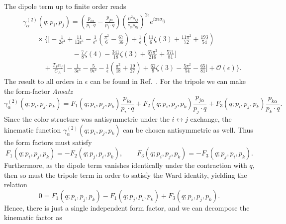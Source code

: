 \documentclass[a4paper,11pt]{article}
\begin{document}
The dipole term up to finite order reads
\begin{equation}
\begin{split}
&\gamma^{(2)}_\alpha (q; p_i, p_j) = \left( \frac{p_{i \alpha}}{p_{i} \cdot q} - \frac{p_{j \alpha}}{p_j \cdot q} \right) \left( \frac{\mu^2 s_{ij}}{s_{qi} s_{qj}} \right)^{2\epsilon} e^{i \pi \epsilon \sigma_{ij}} \\
& \qquad \times \bigg \lbrace  \bigg [-\frac{1}{2 \epsilon^4} + \frac{11}{12 \epsilon^3} - \frac{1}{\epsilon^2} \left(\frac{\pi^2}{6} - \frac{67}{36}\right)  + \frac{1}{\epsilon} \left(\frac{11}{6} \zeta(3) + \frac{11 \pi^2}{72} + \frac{193}{54}\right)  \\
& \hspace{3cm} - \frac{7}{8} \zeta(4) - \frac{341}{18} \zeta(3) + \frac{67 \pi^2}{216} + \frac{571}{81} \bigg ] \\
& \qquad \quad + \frac{T_F n_f}{C_A} \bigg [ - \frac{1}{3 \epsilon^3} - \frac{5}{9 \epsilon^2} - \frac{1}{\epsilon} \left(\frac{\pi^2}{18} + \frac{19}{27} \right) + \frac{62}{9} \zeta(3) - \frac{5 \pi^2}{54} - \frac{65}{81} \bigg ] + \mathcal{O}(\epsilon) \bigg \rbrace.
\end{split}
\end{equation}
The result to all orders in $\epsilon$ can be found in Ref.~\cite{Duhr:2013msa}. For the tripole we can make the form-factor \textit{Ansatz}
\begin{equation}
\gamma_\alpha^{(2)}(q; p_i, p_j, p_k) = F_1(q; p_i, p_j, p_k) \frac{p_{i\alpha}}{p_i \cdot q} +  F_2(q; p_i, p_j, p_k) \frac{p_{j\alpha}}{p_j \cdot q} +  F_3(q; p_i, p_j, p_k) \frac{p_{k\alpha}}{p_k \cdot q}.
\end{equation}
Since the color structure was antisymmetric under the $i \leftrightarrow j$ exchange, the kinematic function $\gamma_\alpha^{(2)}(q; p_i, p_j, p_k)$ can be chosen antisymmetric as well. Thus the form factors must satisfy
\begin{equation}
F_1(q; p_i, p_j, p_k) = - F_2(q; p_j, p_i, p_k), \qquad F_3(q; p_i, p_j, p_k) = - F_3(q; p_j, p_i, p_k).
\end{equation}
Furthermore, as the dipole term vanishes identically under the contraction with $q$, then so must the tripole term in order to satisfy the Ward identity, yielding the relation
\begin{equation}
0 = F_1(q; p_i, p_j, p_k) - F_1(q; p_j, p_i, p_k) + F_3(q; p_i, p_j, p_k).
\end{equation}
Hence, there is just a single independent form factor, and we can decompose the kinematic factor as
\end{document}
